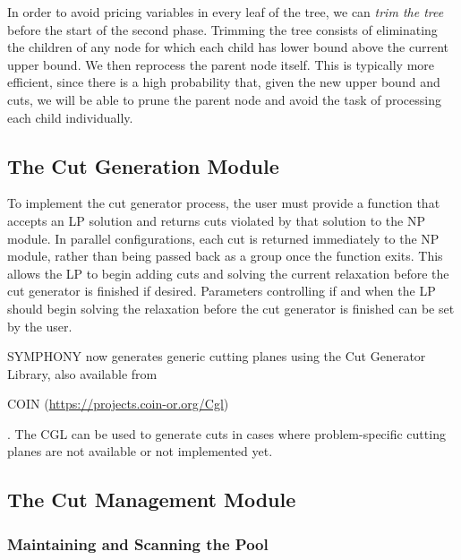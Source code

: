 In order to avoid pricing variables in every leaf of the tree, we can
{\em trim the tree} before the start of the second phase. Trimming the
tree consists of eliminating the children of any node for which
each child has lower bound above the current upper
bound. We then reprocess the parent node itself. This is typically
more efficient, since there is a high probability that, given the new
upper bound and cuts, we will be able to prune the parent node and
avoid the task of processing each child individually.

\subsection{The Cut Generation Module}

To implement the cut generator process, the user must provide a
function that accepts an LP solution and returns cuts violated by that
solution to the NP module. In parallel configurations, each cut is
returned immediately to the NP module, rather than being passed back
as a group once the function exits. This allows the LP to begin adding
cuts and solving the current relaxation before the cut generator is
finished if desired. Parameters controlling if and when the LP should
begin solving the relaxation before the cut generator is finished can
be set by the user.

SYMPHONY now generates generic cutting planes using the Cut Generator Library,
also available from 
\begin{latexonly} 
COIN (\url{https://projects.coin-or.org/Cgl})
\end{latexonly}.
The CGL can be used to generate cuts in cases where problem-specific cutting
planes are not available or not implemented yet. 

\subsection{The Cut Management Module}

\subsubsection{Maintaining and Scanning the Pool}

